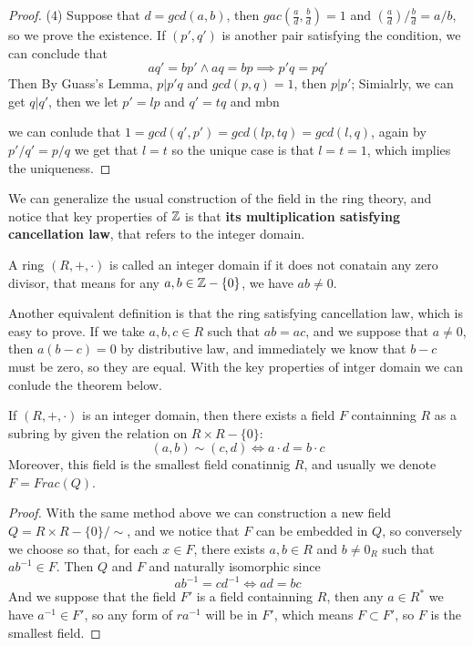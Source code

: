 \documentclass[en,geye,blue,normal,12pt]{elegantnote}
\begin{document}
\begin{proposition}
\begin{proof}
    (4) Suppose that \(d = gcd(a,b)\), then \(gac(\frac{a}{d},\frac{b}{d}) =1\) and \((\frac{a}{d})/\frac{b}{d} = a/b\), so we prove the existence. If \((p',q')\) is another pair satisfying the condition, we can conclude that 
    \[aq' = bp' \land aq =bp \implies p'q = pq'\]
    Then By Guass's Lemma, \(p|p'q\) and \(gcd(p,q)=1\), then \(p|p'\); Simialrly, we can get \(q|q'\), then we let \(p' = lp\) and \(q' =tq\) and mbn 
    
    
    we can conlude that \(1 = gcd(q',p') = gcd(lp,tq) = gcd(l,q)\), again by \(p'/q' = p/q\) we get that \(l=t\) so the unique case is that \(l=t=1\), which implies the uniqueness.
    \end{proof}
\end{proposition}

We can generalize the usual construction of the field in the ring theory, and notice that key properties of \(\mathbb{Z}\) is that \textbf{its multiplication satisfying cancellation law}, that refers to the integer domain.

\begin{definition}
  A ring \((R,+,\cdot)\) is called an integer domain if it does not conatain any zero divisor, that means for any \(a,b \in \mathbb{Z}-\{0\}\), we have \(ab \neq 0\).
\end{definition}

Another equivalent definition is that the ring satisfying cancellation law, which is easy to prove. If we take \(a,b,c \in R\) such that \(ab=ac\), and we suppose that \(a\neq 0\), then \(a(b-c) = 0\) by distributive law, and immediately we know that \(b-c\) must be zero, so they are equal. With the key properties of intger domain we can conlude the theorem below.

\begin{theorem}
  If \((R,+,\cdot)\) is an integer domain, then there exists a field \(F\) containning \(R\) as a subring by given the relation on \(R\times R-\{0\}\):
  \[(a,b) \sim (c,d) \iff a\cdot d = b\cdot c\]
  Moreover, this field is the smallest field conatinnig \(R\), and usually we denote \(F = Frac(Q)\).

  \begin{proof}
    With the same method above we can construction a new field \(Q = R\times R-\{0\}/\sim\), and we notice that \(F\) can be embedded in \(Q\), so conversely we choose so that, for each \(x \in F\), there exists \(a,b\in R \) and \(b \neq 0_R\) such that \(ab^{-1} \in F\). Then \(Q\) and \(F\) and naturally isomorphic since 
    \[ab^{-1} = cd^{-1} \iff ad = bc\]
    And we suppose that the field \(F'\) is a field containning \(R\), then any \(a \in R^*\) we have \(a^{-1} \in F'\), so any form of \(ra^{-1}\) will be in \(F'\), which means \(F \subset F'\), so \(F\) is the smallest field.
  \end{proof}
\end{theorem}
\end{document}
